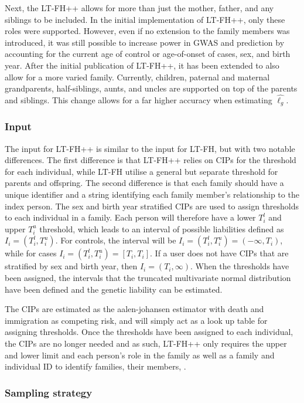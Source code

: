 Next, the LT-FH++ allows for more than just the mother, father, and any siblings to be included. In the initial implementation of LT-FH++, only these roles were supported. However, even if no extension to the family members was introduced, it was still possible to increase power in GWAS and prediction by accounting for the current age of control or age-of-onset of cases, sex, and birth year. After the initial publication of LT-FH++, it has been extended to also allow for a more varied family. Currently, children, paternal and maternal grandparents, half-siblings, aunts, and uncles are supported on top of the parents and siblings. This change allows for a far higher accuracy when estimating $ \hat{\ell_g} $. 


\subsubsection{Input}
The input for LT-FH++ is similar to the input for LT-FH, but with two notable differences. The first difference is that LT-FH++ relies on CIPs for the threshold for each individual, while LT-FH utilise a general but separate threshold for parents and offspring. The second difference is that each family should have a unique identifier and a string identifying each family member's relationship to the index person. The sex and birth year stratified CIPs are used to assign thresholds to each individual in a family. Each person will therefore have a lower $ T_i^l $ and upper $ T_i^u $ threshold, which leads to an interval of possible liabilities defined as $ I_i = (T_i^l, T_i^u) $. For controls, the interval will be $ I_i = (T_i^l,T_i^u) = (-\infty, T_i) $, while for cases $ I_i = (T_i^l,T_i^u) = [T_i,T_i] $. If a user does not have CIPs that are stratified by sex and birth year, then $ I_i = (T_i, \infty) $. When the thresholds have been assigned, the intervals that the truncated multivariate normal distribution have been defined and the genetic liability can be estimated. 

The CIPs are estimated as the aalen-johansen estimator with death and immigration as competing risk, and will simply act as a look up table for assigning thresholds. Once the thresholds have been assigned to each individual, the CIPs are no longer needed and as such, LT-FH++ only requires the upper and lower limit and each person's role in the family as well as a family and individual ID to identify families, their members, . 

\subsubsection{Sampling strategy}

